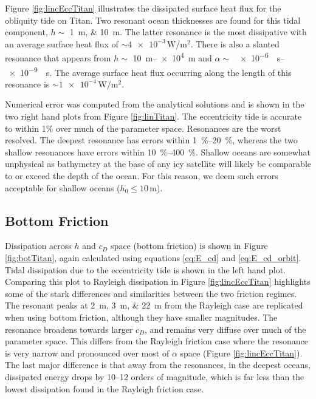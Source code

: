 Figure \ref{fig:lincEccTitan} illustrates the dissipated surface heat flux for the obliquity tide on Titan. Two resonant ocean thicknesses are found for this tidal component, $h \sim$ \SIlist{1;10}{\metre}. The latter resonance is the most dissipative with an average surface heat flux of $\sim \num{4e-3}\, \si{\watt\per\square\metre}$. There is also a slanted resonance that appears from $h \sim$ \SIrange{10}{e4}{\metre} and \hbox{$\alpha \sim$ \SIrange{e-6}{e-9}{\per\second}}. The average surface heat flux occurring along the length of this resonance is $\sim \num{1e-4}\, \si{\watt\per\square\metre}$. 

Numerical error was computed from the analytical solutions and is shown in the two right hand plots from Figure \ref{fig:linTitan}. The eccentricity tide is accurate to within 1\% over much of the parameter space. Resonances are the worst resolved. The deepest resonance has errors within \SIrange{1}{20}{\percent}, whereas the two shallow resonances have errors within \SIrange{10}{400}{\percent}. Shallow oceans are somewhat unphysical as bathymetry at the base of any icy satellite will likely be comparable to or exceed the depth of the ocean. For this reason, we deem such errors acceptable for shallow oceans ($h_0 \leq 10 \, \si{\metre}$).

\subsection{Bottom Friction \label{subsec:botTitan}}

Dissipation across $h$ and $c_D$ space (bottom friction) is shown in Figure \ref{fig:botTitan}, again calculated using equations \ref{eq:E_cd} and \ref{eq:E_cd_orbit}. Tidal dissipation due to the eccentricity tide is shown in the left hand plot. Comparing this plot to Rayleigh dissipation in Figure \ref{fig:lincEccTitan} highlights some of the stark differences and similarities between the two friction regimes. The resonant peaks at \SIlist{2;3;22}{\metre} from the Rayleigh case are replicated when using bottom friction, although they have smaller magnitudes. The resonance broadens towards larger $c_D$, and remains very diffuse over much of the parameter space. This differs from the Rayleigh friction case where the resonance is very narrow and pronounced over most of $\alpha$ space (Figure \ref{fig:lincEccTitan}). The last major difference is that away from the resonances, in the deepest oceans, dissipated energy drops by \numrange{10}{12} orders of magnitude, which is far less than the lowest dissipation found in the Rayleigh friction case.  

